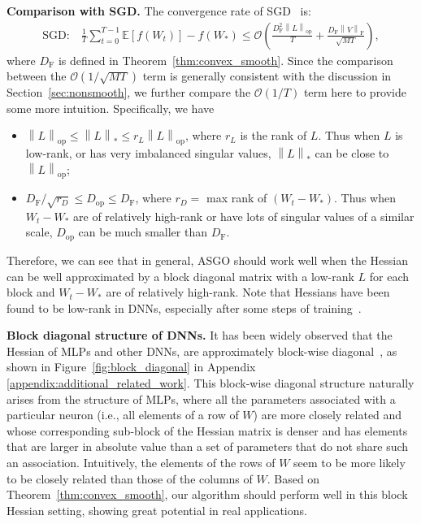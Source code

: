 \documentclass{article}
\theoremstyle{remark}
\newcommand{\Norm}[1]{\left\|#1\right\|}
\newcommand{\EE}{\mathbb{E}}
\newcommand{\cO}{\mathcal{O}}
\begin{document}
\textbf{Comparison with SGD.} The convergence rate of SGD~\citep{garrigos2023handbook} is:
    \begin{align*}
        \text{SGD:} \quad \frac{1}{T} \sum_{t=0}^{T-1} \EE[f(W_t)] - f(W_*) \le \cO\left( \frac{D_{\mathrm{F}}^2 \Norm{L}_{\mathrm{op}}}{T} + \frac{D_{\mathrm{F}} \Norm{V}_{\mathrm{F}}}{\sqrt{MT}}\right) ,
    \end{align*}
    where $D_{\mathrm{F}}$ is defined in Theorem~\ref{thm:convex_smooth}. Since the comparison between the $\cO(1/\sqrt{MT})$ term is generally consistent with the discussion in Section~\ref{sec:nonsmooth}, we further compare the $\cO(1/T)$ term here to provide some more intuition.
    Specifically, we have
    \begin{itemize}[leftmargin=*]
        \item $\Norm{L}_{\mathrm{op}} \le \Norm{L}_* \le r_L \Norm{L}_{\mathrm{op}} $, where $r_L$ is the rank of $L$. Thus when $L$ is low-rank, or has very imbalanced singular values, $\Norm{L}_*$ can be close to $\Norm{L}_{\mathrm{op}}$;
        \item $D_{\mathrm{F}}/\sqrt{r_D} \le D_{\mathrm{op}} \le D_{\mathrm{F}}$, where $r_D =$ max rank of $(W_t - W_*)$. Thus when $W_t - W_*$ are of relatively high-rank or have lots of singular values of a similar scale, $D_{\mathrm{op}}$ can be much smaller than $D_{\mathrm{F}}$.
    \end{itemize}
    Therefore, we can see that in general, ASGO should work well when the Hessian can be well approximated by a block diagonal matrix with a low-rank $L$ for each block and $W_t - W_*$ are of relatively high-rank. Note that Hessians have been found to be low-rank in DNNs, especially after some steps of training~\citep{sagun2016eigenvalues,sagun2017empirical,wu2020dissecting}.
    
    \textbf{Block diagonal structure of DNNs.} It has been widely observed that the Hessian of MLPs and other DNNs, are approximately block-wise diagonal~\citep{collobert2004large,zhang2024transformers,zhang2024adam,bahamou2022miniblockfishermethoddeep}, as shown in Figure~\ref{fig:block_diagonal} in Appendix \ref{appendix:additional_related_work}. This block-wise diagonal structure naturally arises from the structure of MLPs, where all the parameters associated with a particular neuron (i.e., all elements of 
    a row of $W$) are more closely related and whose corresponding sub-block of the Hessian matrix is denser and has elements that are larger in absolute value
    than a set of parameters that do not share such an association. Intuitively, the elements of the rows of $W$ seem to be more likely to be closely related 
    than those of
    the columns of $W$. Based on Theorem~\ref{thm:convex_smooth}, our algorithm should perform well in this block Hessian setting, showing great potential in real applications.
    
\end{document}
